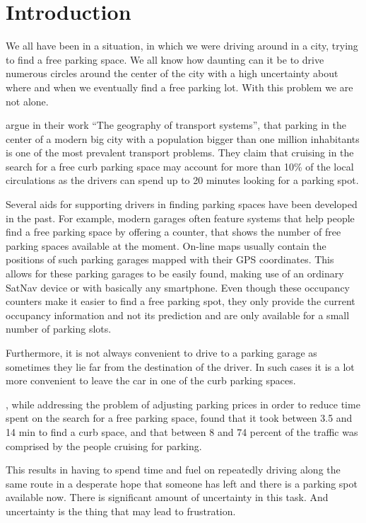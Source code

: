 \chapter{Introduction} %
\label{cha:introduction}

We all have been in a situation, in which we were driving around in a city,
trying to find a free parking space. We all know how daunting can it be to
drive numerous circles around the center of the city with a high uncertainty
about where and when we eventually find a free parking lot. With this problem
we are not alone.

\citet{rodrigue2013geography} argue in their work ``The geography of transport
systems'', that parking in the center of a modern big city with a population
bigger than one million inhabitants is one of the most prevalent transport
problems. They claim that cruising in the search for a free curb parking space
may account for more than 10\% of the local circulations as the drivers can
spend up to 20 minutes looking for a parking spot.

Several aids for supporting drivers in finding parking spaces have been
developed in the past. For example, modern garages often feature systems that
help people find a free parking space by offering a counter, that shows the
number of free parking spaces available at the moment. On-line maps usually
contain the positions of such parking garages mapped with their GPS
coordinates. This allows for these parking garages to be easily found, making
use of an ordinary SatNav device or with basically any smartphone. Even though
these occupancy counters make it easier to find a free parking spot, they only
provide the current occupancy information and not its prediction and are only
available for a small number of parking slots.

Furthermore, it is not always convenient to drive to a parking garage as
sometimes they lie far from the destination of the driver. In such cases it is
a lot more convenient to leave the car in one of the curb parking spaces.

\citet{shoup2006cruising}, while addressing the problem of adjusting parking
prices in order to reduce time spent on the search for a free parking space,
found that it took between 3.5 and 14 min to find a curb space, and that
between 8 and 74 percent of the traffic was comprised by the people cruising
for parking.

This results in having to spend time and fuel on repeatedly driving along the
same route in a desperate hope that someone has left and there is a parking
spot available now. There is significant amount of uncertainty in this task.
And uncertainty is the thing that may lead to frustration.

